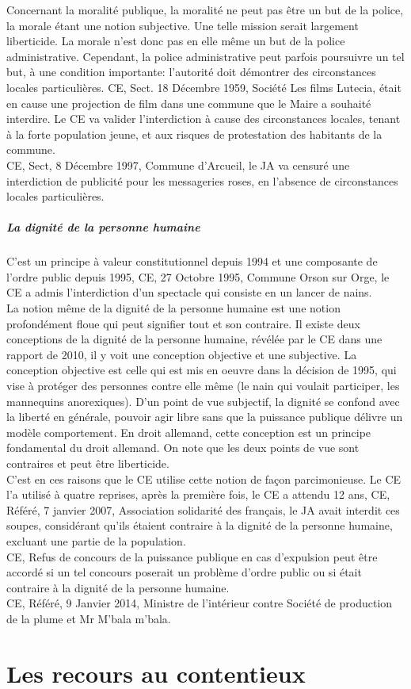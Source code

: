\documentclass[10pt, a4paper, openany]{book}
\begin{document}
Concernant la moralité publique, la moralité ne peut pas être un but de la police, la morale étant une notion subjective. Une telle mission serait largement liberticide. La morale n'est donc pas en elle même un but de la police administrative. Cependant, la police administrative peut parfois poursuivre un tel but, à une condition importante: l'autorité doit démontrer des circonstances locales particulières. CE, Sect. 18 Décembre 1959, Société Les films Lutecia, était en cause une projection de film dans une commune que le Maire a souhaité interdire. Le CE va valider l'interdiction à cause des circonstances locales, tenant à la forte population jeune, et aux risques de protestation des habitants de la commune. \\
CE, Sect, 8 Décembre 1997, Commune d'Arcueil, le JA va censuré une interdiction de publicité pour les messageries roses, en l'absence de circonstances locales particulières. 

\subsubsection{La dignité de la personne humaine}

C'est un principe à valeur constitutionnel depuis 1994 et une composante de l'ordre public depuis 1995, CE, 27 Octobre 1995, Commune Orson sur Orge, le CE a admis l'interdiction d'un spectacle qui consiste en un lancer de nains. \\
La notion même de la dignité de la personne humaine est une notion profondément floue qui peut signifier tout et son contraire. Il existe deux conceptions de la dignité de la personne humaine, révélée par le CE dans une rapport de 2010, il y voit une conception objective et une subjective. La conception objective est celle qui est mis en oeuvre dans la décision de 1995, qui vise à protéger des personnes contre elle même (le nain qui voulait participer, les mannequins anorexiques). D'un point de vue subjectif, la dignité se confond avec la liberté en générale, pouvoir agir libre sans que la puissance publique délivre un modèle comportement. En droit allemand, cette conception est un principe fondamental du droit allemand. On note que les deux points de vue sont contraires et peut être liberticide. \\
C'est en ces raisons que le CE utilise cette notion de façon parcimonieuse. Le CE l'a utilisé à quatre reprises, après la première fois, le CE a attendu 12 ans, CE, Référé, 7 janvier 2007, Association solidarité des français, le JA avait interdit ces soupes, considérant qu'ils étaient contraire à la dignité de la personne humaine, excluant une partie de la population. \\
CE, Refus de concours de la puissance publique en cas d'expulsion peut être accordé si un tel concours poserait un problème d'ordre public ou si était contraire à la dignité de la personne humaine. \\
CE, Référé, 9 Janvier 2014, Ministre de l'intérieur contre Société de production de la plume et Mr M'bala m'bala. 


\part{Les recours au contentieux}
\end{document}
